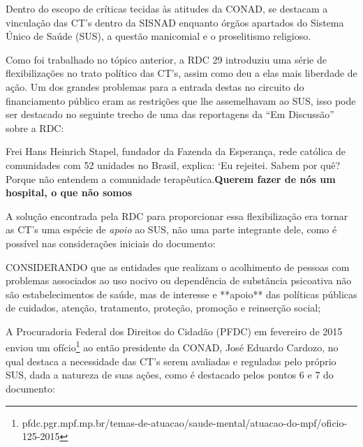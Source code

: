\documentclass[
	12pt,				%
	oneside,			%
	a4paper,			%
	sumario=tradicional,
	english,			%
	brazil				%
	]{abntex2}
\begin{document}
Dentro do escopo de críticas tecidas às atitudes da CONAD, se destacam a vinculação das CT's dentro da SISNAD enquanto órgãos apartados do Sistema Único de Saúde (\acrshort{SUS}), a questão manicomial e o proselitismo religioso.

Como foi trabalhado no tópico anterior, a RDC 29 introduziu uma série de flexibilizações no trato político das CT's, assim como deu a elas mais liberdade de ação. Um dos grandes problemas para a entrada destas no circuito do financiamento público eram as restrições que lhe assemelhavam ao SUS, isso pode ser destacado no seguinte trecho de uma das reportagens da ``Em Discussão'' sobre a RDC:
\begin{quoting}[rightmargin=0cm,leftmargin=4cm]
\begin{singlespace}
{\footnotesize
Frei Hans Heinrich Stapel, fundador da Fazenda da Esperança, rede católica de comunidades com 52 unidades no Brasil, explica: ‘Eu rejeitei. Sabem por quê? Porque não entendem a comunidade terapêutica.\textbf{Querem fazer de nós um hospital, o que não somos} \cite[p. 66, grifo meu]{discussao2011}}
\end{singlespace}
\end{quoting}
A solução encontrada pela RDC para proporcionar essa flexibilização era tornar as CT's uma espécie de \emph{apoio} ao SUS, não uma parte integrante dele, como é possível nas considerações iniciais do documento:
\begin{quoting}[rightmargin=0cm,leftmargin=4cm]
\begin{singlespace}
{\footnotesize
CONSIDERANDO que as entidades que realizam o acolhimento de pessoas com problemas associados ao uso nocivo ou dependência de substância psicoativa não são estabelecimentos de saúde, mas de interesse e **apoio** das políticas públicas de cuidados, atenção, tratamento, proteção, promoção e reinserção social; \cite{brasil2015}}
\end{singlespace}
\end{quoting}
A Procuradoria Federal dos Direitos do Cidadão (PFDC) em fevereiro de 2015 enviou um ofício\footnote{pfdc.pgr.mpf.mp.br/temas-de-atuacao/saude-mental/atuacao-do-mpf/oficio-125-2015} ao então presidente da CONAD, José Eduardo Cardozo, no qual destaca a necessidade das CT's serem avaliadas e reguladas pelo próprio SUS, dada a natureza de suas ações, como é destacado pelos pontos 6 e 7 do documento:
\end{document}
